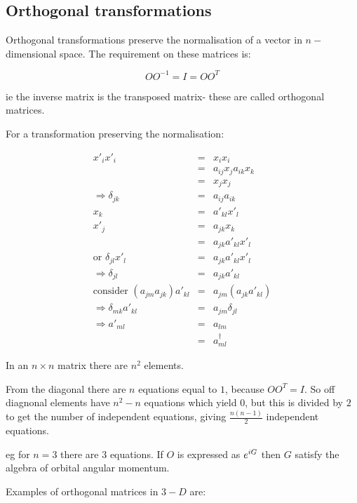 \subsection{Orthogonal transformations}

Orthogonal transformations preserve the normalisation of a vector in $n-$dimensional space.  The requirement on these matrices is:

\[
  OO^{-1} = I = OO^T
\]

ie the inverse matrix is the transposed matrix- these are called orthogonal matrices.

For a transformation preserving the normalisation:

\begin{eqnarray*}
  x'_i x'_i & = & x_i x_i \\
  & = & a_{ij}x_ja_{ik}x_k \\
  & = & x_j x_j \\
  \Rightarrow \delta_{jk} & = &a_{ij} a_{ik} \\
  x_k & = & a'_{kl}x'_l \\
  x'_j & = & a_{jk}x_k \\
  & = & a_{jk}a'_{kl}x'_l \\
  \textrm{or } \delta_{jl}x'_l & = & a_{jk}a'_{kl}x'_l \\
  \Rightarrow \delta_{jl} & = & a_{jk}a'_{kl} \\
  \textrm{consider } \left(a_{jm}a_{jk}\right)a'_{kl} & = & a_{jm}\left(a_{jk}a'_{kl}\right) \\
  \Rightarrow \delta_{mk}a'_{kl} & = & a_{jm}\delta_{jl} \\
  \Rightarrow a'_{ml} & = & a_{lm} \\
  & = & a^{\dagger}_{ml}
\end{eqnarray*}

In an $n\times n$ matrix there are $n^2$ elements.

From the diagonal there are $n$ equations equal to $1$, because $OO^T = I$.  So off diagnonal elements have $n^2 - n$ equations which yield $0$, but this is divided by $2$ to get the number of independent equations, giving $\frac{n(n-1)}{2}$ independent equations.

eg for $n = 3$ there are $3$ equations.  If $O$ is expressed as $e^{iG}$ then $G$ satisfy the algebra of orbital angular momentum.

Examples of orthogonal matrices in $3-D$ are:

